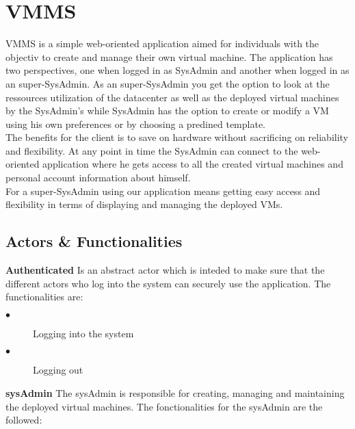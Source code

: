 \section{VMMS}

VMMS is a simple web-oriented application aimed for individuals with the
objectiv to create and manage their own virtual machine. The application    
has two perspectives, one when logged in as SysAdmin and another when
logged in as an super-SysAdmin. As an super-SysAdmin you get the option to look
at the ressources utilization of the datacenter as well as the deployed virtual
machines by the SysAdmin's while SysAdmin has the option to create or modify 
a VM using his own preferences or by choosing a predined template.\\The benefits
for the client is to save on hardware without sacrificing on reliability and 
flexibility. At any point in time the SysAdmin can connect to the web-oriented
application where he gets access to all the created virtual machines and
personal account information about himself.\\For a super-SysAdmin using our
application means getting easy access and flexibility in terms of displaying and
managing the deployed VMs.

\subsection{Actors \& Functionalities}



\textbf{Authenticated} Is an abstract actor which is inteded to make sure that
the different actors who log into the system can securely use the application. 
The functionalities are:

\begin{description}

\item[$\bullet$] Logging into the system
\item[$\bullet$] Logging out
\end{description}
\textbf{sysAdmin} The sysAdmin is responsible for creating, managing and
maintaining the deployed virtual machines. The fonctionalities for the sysAdmin 
are the followed:

